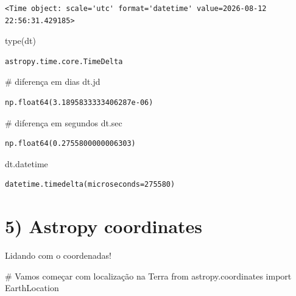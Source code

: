 \documentclass[
  letterpaper,
  DIV=11,
  numbers=noendperiod]{scrreprt}
\newenvironment{Shaded}{\begin{snugshade}}{\end{snugshade}}
\newcommand{\BuiltInTok}[1]{\textcolor[rgb]{0.00,0.23,0.31}{#1}}
\newcommand{\CommentTok}[1]{\textcolor[rgb]{0.37,0.37,0.37}{#1}}
\newcommand{\ImportTok}[1]{\textcolor[rgb]{0.00,0.46,0.62}{#1}}
\newcommand{\NormalTok}[1]{\textcolor[rgb]{0.00,0.23,0.31}{#1}}
\begin{document}
\begin{verbatim}
<Time object: scale='utc' format='datetime' value=2026-08-12 22:56:31.429185>
\end{verbatim}

\begin{Shaded}
\begin{Highlighting}[]
\BuiltInTok{type}\NormalTok{(dt)}
\end{Highlighting}
\end{Shaded}

\begin{verbatim}
astropy.time.core.TimeDelta
\end{verbatim}

\begin{Shaded}
\begin{Highlighting}[]
\CommentTok{\# diferença em dias}
\NormalTok{dt.jd}
\end{Highlighting}
\end{Shaded}

\begin{verbatim}
np.float64(3.1895833333406287e-06)
\end{verbatim}

\begin{Shaded}
\begin{Highlighting}[]
\CommentTok{\# diferença em segundos}
\NormalTok{dt.sec}
\end{Highlighting}
\end{Shaded}

\begin{verbatim}
np.float64(0.2755800000006303)
\end{verbatim}

\begin{Shaded}
\begin{Highlighting}[]
\NormalTok{dt.datetime}
\end{Highlighting}
\end{Shaded}

\begin{verbatim}
datetime.timedelta(microseconds=275580)
\end{verbatim}

\section{5) Astropy coordinates}\label{astropy-coordinates}

Lidando com o coordenadas!

\begin{Shaded}
\begin{Highlighting}[]
\CommentTok{\# Vamos começar com localização na Terra}
\ImportTok{from}\NormalTok{ astropy.coordinates }\ImportTok{import}\NormalTok{ EarthLocation}
\end{Highlighting}
\end{Shaded}
\end{document}
